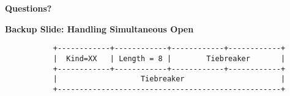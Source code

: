 \documentclass[helvetica]{seminar}
\newcommand{\heading}[1]{%
  \begin{center} 
    \large\bf 
    #1 
  \end{center} 
  \vspace{.4 in}}
\begin{document}
\begin{slide}
\heading{Questions?}

\end{slide}

\begin{slide}
\heading{Backup Slide: Handling Simultaneous Open}

\begin{verbatim}
           +------------+------------+------------+------------+
           |  Kind=XX   | Length = 8 |        Tiebreaker       |
           +------------+------------+------------+------------+
           |                   Tiebreaker                      |
           +---------------------------------------------------+
\end{verbatim}
\end{slide}
\end{document}
